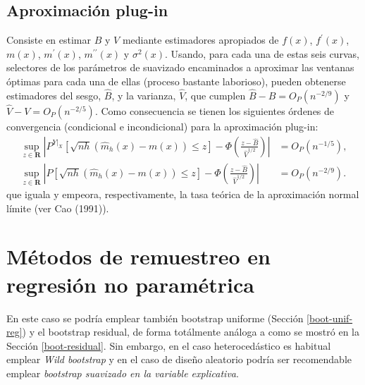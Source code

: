 \documentclass[
]{book}
\theoremstyle{break}
\theoremstyle{definition}
\theoremstyle{definition}
\theoremstyle{definition}
\theoremstyle{remark}
\begin{document}
\hypertarget{aproximaciuxf3n-plug-in-1}{%
\subsection{Aproximación plug-in}\label{aproximaciuxf3n-plug-in-1}}

Consiste en estimar \(B\) y \(V\) mediante estimadores apropiados de
\(f\left(x \right)\), \(f^{\prime}\left( x \right)\), \(m\left( x \right)\),
\(m^{\prime}\left( x \right)\), \(m^{\prime \prime }\left( x \right)\) y
\(\sigma^2\left( x \right)\). Usando, para cada una de estas seis curvas,
selectores de los parámetros de suavizado encaminados a aproximar las
ventanas óptimas para cada una de ellas (proceso bastante laborioso),
pueden obtenerse estimadores del sesgo, \(\hat{B}\), y la varianza,
\(\hat{V}\), que cumplen \(\hat{B}-B=O_{P}\left( n^{-2/9} \right)\) y
\(\hat{V}-V=O_{P}\left( n^{-2/5} \right)\).
Como consecuencia se tienen los siguientes órdenes de convergencia
(condicional e incondicional) para la aproximación plug-in:
\[\begin{aligned}
\sup_{z\in \boldsymbol{R}}\left\vert P^{\left. Y\right\vert _{X}}\left[ 
\sqrt{nh}\left( \hat{m}_{h}\left( x \right) -m\left( x \right) \right) \leq z
\right] -\Phi \left( \frac{z-\hat{B}}{\hat{V}^{1/2}} \right) \right\vert
&= O_{P}\left( n^{-1/5} \right), \\
\sup_{z\in \boldsymbol{R}}\left\vert P\left[ \sqrt{nh}\left( \hat{m}
_{h}\left( x \right) -m\left( x \right) \right) \leq z\right] -\Phi \left( 
\frac{z-\hat{B}}{\hat{V}^{1/2}} \right) \right\vert &= O_{P}\left(
n^{-2/9} \right).
\end{aligned}\]
que iguala y empeora, respectivamente,
la tasa teórica de la aproximación normal límite (ver Cao (1991)).

\hypertarget{muxe9todos-de-remuestreo-en-regresiuxf3n-no-paramuxe9trica}{%
\section{Métodos de remuestreo en regresión no paramétrica}\label{muxe9todos-de-remuestreo-en-regresiuxf3n-no-paramuxe9trica}}

En este caso se podría emplear también bootstrap uniforme (Sección \ref{boot-unif-reg}) y el bootstrap residual, de forma totálmente análoga a como se mostró en la Sección \ref{boot-residual}.
Sin embargo, en el caso heterocedástico es habitual emplear \emph{Wild bootstrap} y en el caso de diseño aleatorio podría ser recomendable emplear \emph{bootstrap suavizado en la variable explicativa}.
\end{document}
